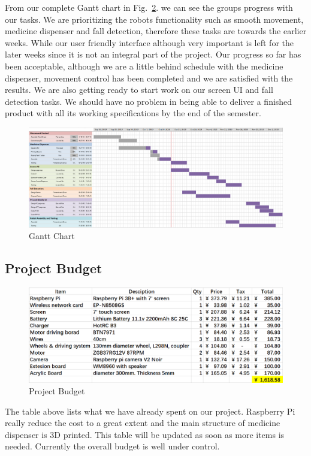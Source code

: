 \documentclass[12pt]{article}
\begin{document}
From our complete Gantt chart in Fig.~\ref{fig::gantt}. we can see the groups progress with our tasks. We are prioritizing the robots functionality such as smooth movement, medicine dispenser and fall detection, therefore these tasks are towards the earlier weeks. While our user friendly interface although very important is left for the later weeks since it is not an integral part of the project.
Our progress so far has been acceptable, although we are a little behind schedule with the medicine dispenser, movement control has been completed and we are satisfied with the results. We are also getting ready to start work on our screen UI and fall detection tasks. We should have no problem in being able to deliver a finished product with all its working specifications by the end of the semester.
\begin{figure}[H]
	
	\centering
	\includegraphics[width=6in]{ganttC.png}
	\caption{Gantt Chart}
	\label{fig::gantt}

\end{figure}
\subsection{Project Budget}
\begin{figure}[H]
	
	\centering
	\includegraphics[width=6in]{budget.png}
	\caption{Project Budget}
	\label{fig::gantt}

\end{figure}
The table above lists what we have already spent on our project. Raspberry Pi really reduce the cost to a great extent and the main structure of medicine dispenser is 3D printed. This table will be updated as soon as more items is needed. Currently the overall budget is well under control.
\end{document}
